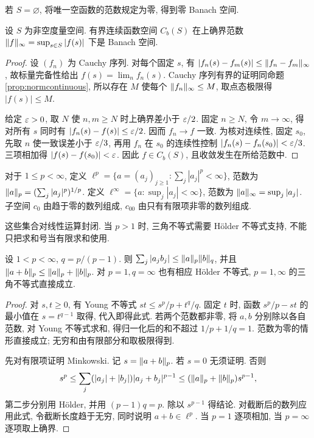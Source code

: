 若 $S=\varnothing$, 将唯一空函数的范数规定为零, 得到零 Banach 空间.
\begin{theorem}\label{thm:cb}
设 $S$ 为非空度量空间. 有界连续函数空间 $C_b(S)$ 在上确界范数 $\lVert f\rVert_\infty=\sup_{s\in S}|f(s)|$ 下是 Banach 空间.
\end{theorem}
\begin{proof}
设 $(f_n)$ 为 Cauchy 序列. 对每个固定 $s$, 有 $|f_n(s)-f_m(s)|\le\lVert f_n-f_m\rVert_\infty$, 故标量完备性给出 $f(s)=\lim_n f_n(s)$. Cauchy 序列有界的证明同命题\ref{prop:normcontinuous}, 所以存在 $M$ 使每个 $\lVert f_n\rVert_\infty\le M$, 取点态极限得 $|f(s)|\le M$.

给定 $\varepsilon>0$, 取 $N$ 使 $n,m\ge N$ 时上确界差小于 $\varepsilon/2$. 固定 $n\ge N$, 令 $m\to\infty$, 得对所有 $s$ 同时有 $|f_n(s)-f(s)|\le\varepsilon/2$. 因而 $f_n\to f$ 一致. 为核对连续性, 固定 $s_0$, 先取 $n$ 使一致误差小于 $\varepsilon/3$, 再用 $f_n$ 在 $s_0$ 的连续性控制 $|f_n(s)-f_n(s_0)|<\varepsilon/3$. 三项相加得 $|f(s)-f(s_0)|<\varepsilon$. 因此 $f\in C_b(S)$, 且收敛发生在所给范数中.
\end{proof}

\begin{definition}
对于 $1\le p<\infty$, 定义 $\ell^p=\{a=(a_j)_{j\ge1}:\sum_j|a_j|^p<\infty\}$, 范数为 $\lVert a\rVert_p=(\sum_j|a_j|^p)^{1/p}$. 定义 $\ell^\infty=\{a:\sup_j|a_j|<\infty\}$, 范数为 $\lVert a\rVert_\infty=\sup_j|a_j|$. 子空间 $c_0$ 由趋于零的数列组成, $c_{00}$ 由只有有限项非零的数列组成.
\end{definition}
这些集合对线性运算封闭. 当 $p>1$ 时, 三角不等式需要 Hölder 不等式支持, 不能只把求和号当有限求和使用.

\begin{lemma}\label{lem:holder-seq}
设 $1<p<\infty$, $q=p/(p-1)$. 则 $\sum_j|a_jb_j|\le\lVert a\rVert_p\lVert b\rVert_q$, 并且 $\lVert a+b\rVert_p\le\lVert a\rVert_p+\lVert b\rVert_p$. 对 $p=1,q=\infty$ 也有相应 Hölder 不等式, $p=1,\infty$ 的三角不等式直接成立.
\end{lemma}
\begin{proof}
对 $s,t\ge0$, 有 Young 不等式 $st\le s^p/p+t^q/q$. 固定 $t$ 时, 函数 $s^p/p-st$ 的最小值在 $s=t^{q-1}$ 取得, 代入即得此式. 若两个范数都非零, 将 $a,b$ 分别除以各自范数, 对 Young 不等式求和, 得归一化后的和不超过 $1/p+1/q=1$. 范数为零的情形直接成立; 无穷和由有限部分和取极限得到.

先对有限项证明 Minkowski. 记 $s=\lVert a+b\rVert_p$. 若 $s=0$ 无须证明. 否则
\[
s^p\le\sum_j(|a_j|+|b_j|)|a_j+b_j|^{p-1}
\le(\lVert a\rVert_p+\lVert b\rVert_p)s^{p-1},
\]
第二步分别用 Hölder, 并用 $(p-1)q=p$. 除以 $s^{p-1}$ 得结论. 对截断后的数列应用此式, 令截断长度趋于无穷, 同时说明 $a+b\in\ell^p$. 当 $p=1$ 逐项相加, 当 $p=\infty$ 逐项取上确界.
\end{proof}

